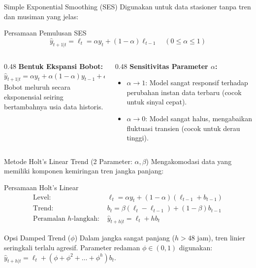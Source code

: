 \documentclass[aspectratio=169, 10pt]{beamer}
\begin{document}
\begin{frame}{Simple Exponential Smoothing (SES)}
    Digunakan untuk data stasioner tanpa tren dan musiman yang jelas:
    \begin{block}{Persamaan Pemulusan SES}
        \begin{equation}
            \hat{y}_{t+1|t} = \ell_t = \alpha y_t + (1 - \alpha)\ell_{t-1} \quad (0 \le \alpha \le 1)
        \end{equation}
    \end{block}
    \begin{columns}[T]
        \begin{column}{0.48\textwidth}
            \textbf{Bentuk Ekspansi Bobot:}
            \begin{equation*}
                \hat{y}_{t+1|t} = \alpha y_t + \alpha(1-\alpha)y_{t-1} + \alpha(1-\alpha)^2y_{t-2} + \dots
            \end{equation*}
            Bobot meluruh secara eksponensial seiring bertambahnya usia data historis.
        \end{column}
        \begin{column}{0.48\textwidth}
            \textbf{Sensitivitas Parameter $\alpha$:}
            \begin{itemize}
                \item $\alpha \to 1$: Model sangat responsif terhadap perubahan instan data terbaru (cocok untuk sinyal cepat).
                \item $\alpha \to 0$: Model sangat halus, mengabaikan fluktuasi transien (cocok untuk derau tinggi).
            \end{itemize}
        \end{column}
    \end{columns}
\end{frame}

\begin{frame}{Metode Holt's Linear Trend (2 Parameter: $\alpha, \beta$)}
    Mengakomodasi data yang memiliki komponen kemiringan tren jangka panjang:
    \begin{block}{Persamaan Holt's Linear}
        \begin{align}
            \text{Level: } &\ell_t = \alpha y_t + (1 - \alpha)(\ell_{t-1} + b_{t-1}) \\
            \text{Trend: } &b_t = \beta (\ell_t - \ell_{t-1}) + (1 - \beta) b_{t-1} \\
            \text{Peramalan $h$-langkah: } &\hat{y}_{t+h|t} = \ell_t + h b_t
        \end{align}
    \end{block}
    \vspace{0.1cm}
    \begin{alertblock}{Opsi Damped Trend ($\phi$)}
        Dalam jangka sangat panjang ($h > 48$ jam), tren linier seringkali terlalu agresif. Parameter redaman $\phi \in (0, 1)$ digunakan: $\hat{y}_{t+h|t} = \ell_t + (\phi + \phi^2 + \dots + \phi^h)b_t$.
    \end{alertblock}
\end{frame}
\end{document}
